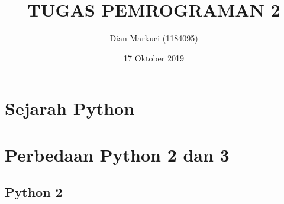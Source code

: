 \documentclass{article}
\title{TUGAS PEMROGRAMAN 2}
\author{Dian Markuci (1184095) }
\date{17 Oktober 2019}
\begin{document}
\maketitle
\begin{center}

    
\end{center}

\section{Sejarah Python}
\usepackage{Pertama kali python diciptakan di Centrum Wiskunde & Informatica (CWI), Belanda pada awal tahun 1990-an. Penciptanya adalah Guido Van Rassum yang terinspirasi dari bahasa pemrograman ABC. Sampai saat ini Guido masih menjadi penulis utama untuk python. Python bersifat open source sehingga ribuan orangpun ikut berkontribusi dalam pengembangannya. Pada tahun 1995, Guido melanjutkan pembuatan python di CNRI di Virginia Amerika, dimana Guido menulis beberapa versi python.Pada tahun 2001, organisasi python di bentuk namanya adalah Python Software Foundation(PSF). PSF sendiri adalah organisasi nirlaba yang dibuat secara khusus untuk segala hal yang berkaitan dengan hak intelektual Python. Nama python tidak berasal dari nama ular. Guido adalah penggemar grup komedi Inggris bernama Monty Python. lalu kemudian ia memberi nama bahasa ciptaannya"Python".}

\section{Perbedaan Python 2 dan 3}
\usepackage{Ada dua versi python yang popular saat ini, yaitu python versi 2 dan python versi 3, lalu apakah perbedaannya? simak penjelasan di bawah ini}
\subsection{Python 2}
\usepackage{Dipublikasi pada sekitar akhir tahun 2000,Penilaian mengenai Python 2 yaitu lebih inklusif dan transparan untuk perkembangan software dibandingkan versi sebelumnya. Hal tersebut didukung adanya PEP – Python Enhancement Proposal, yaitu sebuah spesifikasi teknis yang menjadi tuntunan informasi untuk user dan penggambaran fitur baru pada Python tersebut. Python 2 juga dilengkapi berbagai fitur programatikal seperti cycle-detecting garbage collector sebagai  peningkatan dukungan untuk Unicode,otomasi manajemen memori, list comprehension untuk membuat sebuah list berdasar list yang telah ada. Unifikasi pada tipe data Python dan class ke satu hirarki terjadi pada rilis Python 2.2}
\end{document}
